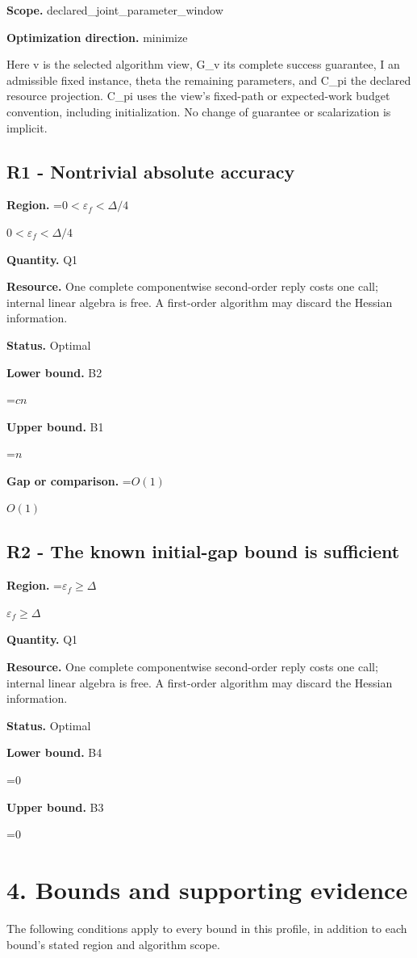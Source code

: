 \documentclass[10pt,a4paper]{article}
\newcommand{\AtlasMath}[1]{\par\begingroup\centering\setbox0=\hbox{$\displaystyle #1$}\ifdim\wd0>1.4\linewidth\typeout{ATLAS WIDE FORMULA: \the\wd0}\fi\ifdim\wd0>\linewidth\resizebox{\linewidth}{!}{\box0}\else\box0\fi\par\endgroup}
\newcommand{\AtlasInlineMath}[1]{\begingroup\setbox0=\hbox{$#1$}\ifdim\wd0>.4\linewidth\endgroup\AtlasMath{#1}\else\endgroup$#1$\fi}
\begin{document}
\textbf{Scope.} declared\_joint\_parameter\_window

\textbf{Optimization direction.} minimize

Here v is the selected algorithm view, G\_v its complete success guarantee, I an admissible fixed instance, theta the remaining parameters, and C\_pi the declared resource projection. C\_pi uses the view's fixed-path or expected-work budget convention, including initialization. No change of guarantee or scalarization is implicit.

\subsection{R1 - Nontrivial absolute accuracy}
\textbf{Region.} \AtlasInlineMath{0<\varepsilon_f<\Delta/4}

\textbf{Quantity.} Q1

\textbf{Resource.} One complete componentwise second-order reply costs one call; internal linear algebra is free. A first-order algorithm may discard the Hessian information.

\textbf{Status.} Optimal

\textbf{Lower bound.} B2

\AtlasMath{cn}
\textbf{Upper bound.} B1

\AtlasMath{n}
\textbf{Gap or comparison.} \AtlasInlineMath{O(1)}

\subsection{R2 - The known initial-gap bound is sufficient}
\textbf{Region.} \AtlasInlineMath{\varepsilon_f\ge\Delta}

\textbf{Quantity.} Q1

\textbf{Resource.} One complete componentwise second-order reply costs one call; internal linear algebra is free. A first-order algorithm may discard the Hessian information.

\textbf{Status.} Optimal

\textbf{Lower bound.} B4

\AtlasMath{0}
\textbf{Upper bound.} B3

\AtlasMath{0}
\section{4. Bounds and supporting evidence}
The following conditions apply to every bound in this profile, in addition to each bound's stated region and algorithm scope.
\end{document}
